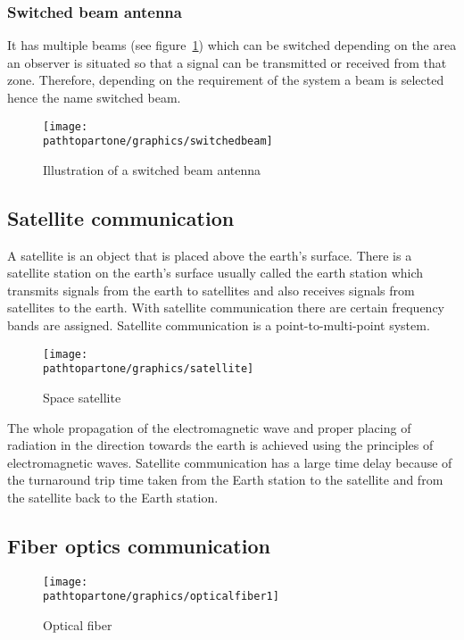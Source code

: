 \subsubsection{Switched beam antenna}
It has multiple beams (see figure~\ref{fig:switchedbeam}) which can be switched depending on the area an observer is situated so that a signal can be transmitted or received from that zone. Therefore, depending on the requirement of the system a beam is selected hence the name switched beam.
\begin{figure}[h]
\centering
\texttt{[image: \\pathtopartone/graphics/switchedbeam]}
\caption{Illustration of a switched beam antenna}
\label{fig:switchedbeam}
\end{figure} 


\subsection{Satellite communication}
A satellite is an object that is placed above the earth's surface. There is a satellite station on the earth's surface usually called the earth station which transmits signals from the earth to satellites and also receives signals from satellites to the earth. With satellite communication there are certain frequency bands are assigned. Satellite communication is a point-to-multi-point system.

\begin{figure}[h]
\centering
\texttt{[image: \\pathtopartone/graphics/satellite]}
\caption{Space satellite}
\end{figure}

The whole propagation of the electromagnetic wave and proper placing of radiation in the direction towards the earth is achieved using the principles of electromagnetic waves. Satellite communication has a large time delay because of the turnaround trip time taken from the Earth station to the satellite and from the satellite back to the Earth station.

\subsection{Fiber optics communication}
\begin{figure}[h]
\centering
\texttt{[image: \\pathtopartone/graphics/opticalfiber1]}
\caption{Optical fiber}
\label{fig:opticalfibre1}
\end{figure}

